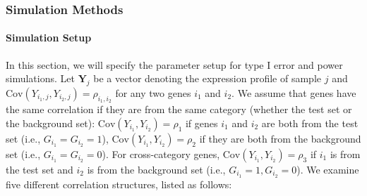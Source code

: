 	
	
	
	\subsubsection{Simulation Methods}
	
	\paragraph{Simulation Setup}\label{subsection:simulation}
	In this section, we will specify the parameter setup for type I error and power simulations. 
	Let $\bm Y_{j}$ be a vector denoting the expression profile of sample $j$ and 
	$\text{Cov}(Y_{i_1, j}, Y_{i_2, j})=\rho_{i_1,i_2}$ for any two genes $i_1$ and $i_2$. 
	We assume that genes have the same correlation if they are from the same category (whether the 
	test set or the background set): $\text{Cov}(Y_{i_1}, Y_{i_2})= \rho_1$ if
	genes $i_1$ and $i_2$ are both from the test set (i.e., $G_{i_1} = G_{i_2}=1$), 
	$\text{Cov}(Y_{i_1}, Y_{i_2}) =\rho_2$ if they are both from the background set (i.e., $G_{i_1} 
	=
	G_{i_2}=0$). For cross-category genes,  $\text{Cov}(Y_{i_1}, Y_{i_2})= \rho_3$ if $i_1$ is from 
	the test set and 
	$i_2$ is
	from the background set (i.e., $G_{i_1} =1,  G_{i_2}=0$). We examine five different correlation
	structures, listed as follows:
	
